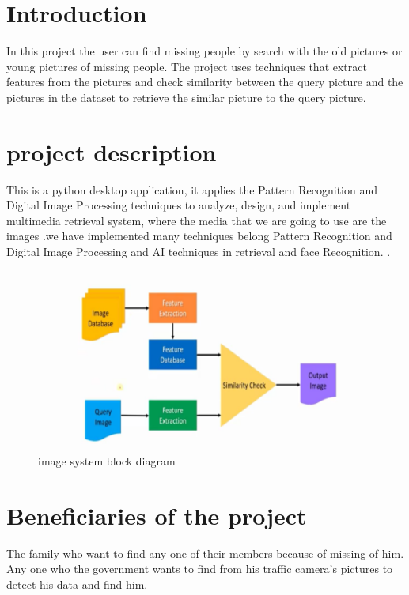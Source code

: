 \documentclass[pdftex,10pt,a4paper,oneside]{article}
\begin{document}
	\pagebreak
	
	\tableofcontents
	\pagebreak
	\listoffigures
	\pagebreak
	\listoftables
	\pagebreak
	\begin{abstract}{
			This paper presents imp DIP project
	}	\end{abstract}
	\pagebreak
	\section*{Introduction}
In this project the user can find missing people by search with the old pictures or young pictures of missing people. The project uses techniques that extract features from the pictures and check similarity between the query picture and the pictures in the dataset to retrieve the similar picture to the query picture.
	 
	
	
	\pagebreak
	
	\section{project description}
	This is a python desktop application, it applies the Pattern Recognition and	Digital Image Processing
	 techniques to analyze, design, and implement multimedia retrieval system, where the media that we are going to use are the images .we have implemented many techniques belong  Pattern Recognition and Digital Image Processing and AI techniques in retrieval and face Recognition.
	 .
	\begin{figure}[H]
		\centering
		\includegraphics[width=120mm,height=60mm]{fig/19.png}
		\caption{image system block diagram }
		\label{image system block diagram}
	\end{figure}

	\pagebreak
	\section{Beneficiaries of the project}
	The family who want to find any one of their members because of missing of him.
	Any one who the government wants to find from his traffic camera's pictures to detect his data and find him.
\end{document}
